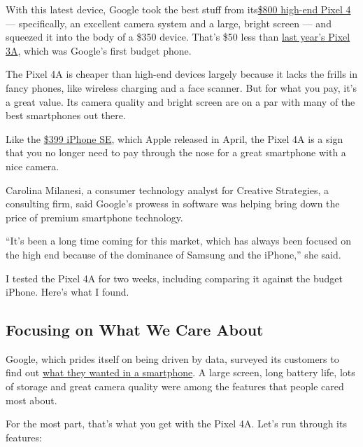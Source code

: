 With this latest device, Google took the best stuff from
its\href{https://www.nytimes3xbfgragh.onion/2019/10/21/technology/personaltech/pixel-4-review.html}{\$800
high-end Pixel 4} --- specifically, an excellent camera system and a
large, bright screen --- and squeezed it into the body of a \$350
device. That's \$50 less than
\href{https://www.nytimes3xbfgragh.onion/2019/05/07/technology/personaltech/pixel-3a.html}{last
year's Pixel 3A}, which was Google's first budget phone.

The Pixel 4A is cheaper than high-end devices largely because it lacks
the frills in fancy phones, like wireless charging and a face scanner.
But for what you pay, it's a great value. Its camera quality and bright
screen are on a par with many of the best smartphones out there.

Like the
\href{https://www.nytimes3xbfgragh.onion/2020/05/06/technology/personaltech/apple-iphone-se-review.html}{\$399
iPhone SE}, which Apple released in April, the Pixel 4A is a sign that
you no longer need to pay through the nose for a great smartphone with a
nice camera.

Carolina Milanesi, a consumer technology analyst for Creative
Strategies, a consulting firm, said Google's prowess in software was
helping bring down the price of premium smartphone technology.

``It's been a long time coming for this market, which has always been
focused on the high end because of the dominance of Samsung and the
iPhone,'' she said.

I tested the Pixel 4A for two weeks, including comparing it against the
budget iPhone. Here's what I found.

\hypertarget{focusing-on-what-we-care-about}{%
\subsection{Focusing on What We Care
About}\label{focusing-on-what-we-care-about}}

Google, which prides itself on being driven by data, surveyed its
customers to find out
\href{https://www.statista.com/chart/5995/the-most-wanted-smartphone-features/}{what
they wanted in a smartphone}. A large screen, long battery life, lots of
storage and great camera quality were among the features that people
cared most about.

For the most part, that's what you get with the Pixel 4A. Let's run
through its features:

